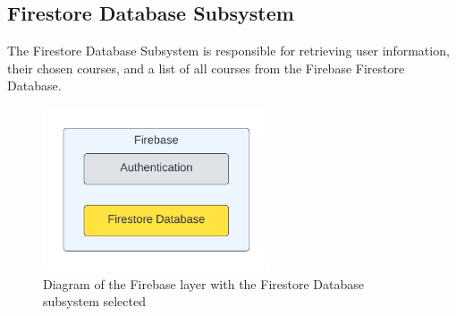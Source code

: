 
\subsection{Firestore Database Subsystem}
The Firestore Database Subsystem is responsible for retrieving user information, their chosen courses, and a list of all courses from the Firebase Firestore Database.

\begin{figure}[h!]
	\centering
	\includegraphics[width=0.60\textwidth]{images/DDS_Diagram_Firebase_Firestore_Database} %
	\caption{Diagram of the Firebase layer with the Firestore Database subsystem selected} %
\end{figure}



